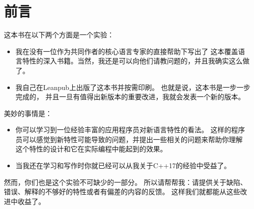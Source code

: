 \chapter{前言}
这本书在以下两个方面是一个实验：
\begin{itemize}
    \item 我在没有一位作为共同作者的核心语言专家的直接帮助下写出了
    这本覆盖语言特性的深入书籍。当然，我还是可以向他们请教问题的，并且我确实这么做了。
    \item 我自己在Leanpub上出版了这本书并按需印刷。
    也就是说，这本书是一步一步完成的，
    并且一旦有值得出新版本的重要改进，我就会发表一个新的版本。
\end{itemize}

美妙的事情是：
\begin{itemize}
    \item 你可以学习到一位经验丰富的应用程序员对新语言特性的看法。
    这样的程序员可以感觉到新特性可能导致的问题，并提出一些相关的问题来帮助你理解
    这个特性的设计和它在实际编程中能起到的效果。
    \item 当我还在学习和写作时你就已经可以从我关于C++17的经验中受益了。
\end{itemize}
然而，你们也是这个实验不可缺少的一部分。
所以请帮帮我：请提供关于缺陷、错误、解释的不够好的特性或者有偏差的内容的反馈。
这样我们就都能从这些改进中收益了。


